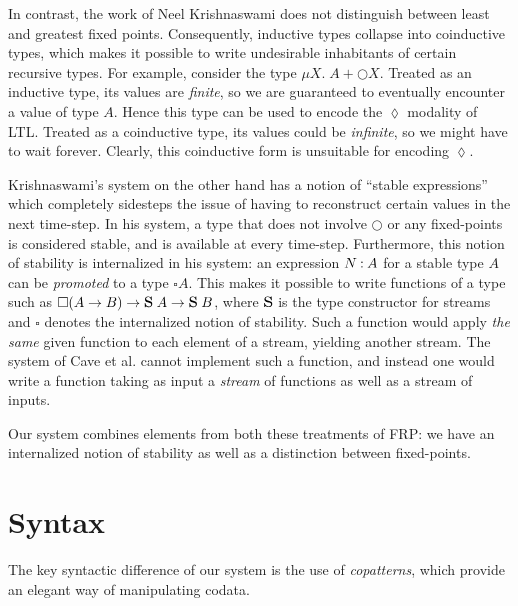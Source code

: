 \documentclass[acmsmall, natbib=false]{acmart}
\renewcommand{\circle}{\bigcirc}
\newcommand{\always}{\square}
\newcommand{\eventually}{\lozenge}
\begin{document}
In contrast, the work of Neel Krishnaswami\cite{neelk1} does not distinguish
between least and greatest fixed points. Consequently, inductive types collapse
into coinductive types, which makes it possible to write undesirable
inhabitants of certain recursive types.
%
For example, consider the type $\mu X.\; A + \circle X$.
Treated as an inductive type, its values are \emph{finite}, so we are
guaranteed to eventually encounter a value of type $A$.
Hence this type can be used to encode the $\eventually$ modality of LTL.
Treated as a coinductive type, its values could be \emph{infinite}, so we might
have to wait forever.
Clearly, this coinductive form is unsuitable for encoding $\eventually$.

Krishnaswami's system on the other hand has a notion of ``stable expressions''
which completely sidesteps the issue of having to reconstruct certain values in
the next time-step.
In his system, a type that does not involve $\circle$ or any fixed-points is
considered stable, and is available at every time-step.
Furthermore, this notion of stability is internalized in his system: an
expression $N \mathbin{:} A$ for a stable type $A$ can be \emph{promoted} to a
type $\always A$.
This makes it possible to write functions of a type such as
$\always (A \to B) \to \mathqd{S}\; A \to \mathqd{S}\; B$,
where $\mathqd{S}$ is the type constructor for streams and $\always$ denotes
the internalized notion of stability.
Such a function would apply \emph{the same} given function to each element of a
stream, yielding another stream.
The system of Cave et al. cannot implement such a function, and instead one
would write a function taking as input a \emph{stream} of functions as well as
a stream of inputs.

Our system combines elements from both these treatments of FRP:
we have an internalized notion of stability as well as a distinction between
fixed-points.

\section{Syntax}
\label{sec:syntax}

The key syntactic difference of our system is the use of
\emph{copatterns}\cite{copatterns}, which provide an elegant way of
manipulating codata.
\end{document}

